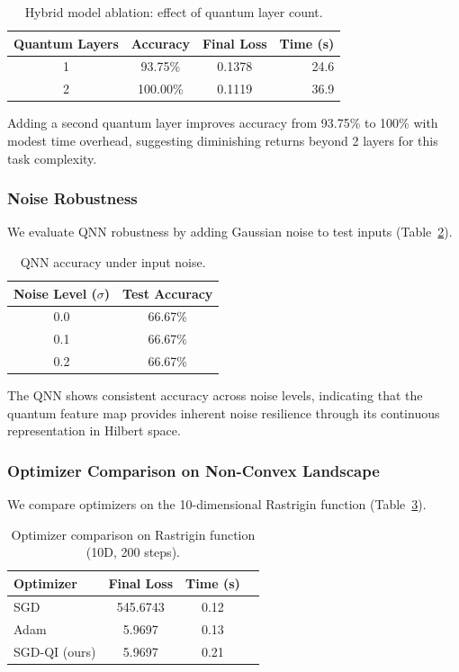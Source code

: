 \documentclass[11pt,a4paper]{article}
\begin{document}
\begin{table}[h]
\centering
\caption{Hybrid model ablation: effect of quantum layer count.}
\label{tab:ablation}
\begin{tabular}{cccr}
\toprule
Quantum Layers & Accuracy & Final Loss & Time (s) \\
\midrule
1 & 93.75\% & 0.1378 & 24.6 \\
2 & 100.00\% & 0.1119 & 36.9 \\
\bottomrule
\end{tabular}
\end{table}

Adding a second quantum layer improves accuracy from 93.75\% to 100\% with modest time overhead, suggesting diminishing returns beyond 2 layers for this task complexity.

\subsubsection{Noise Robustness}
We evaluate QNN robustness by adding Gaussian noise to test inputs (Table~\ref{tab:noise}).

\begin{table}[h]
\centering
\caption{QNN accuracy under input noise.}
\label{tab:noise}
\begin{tabular}{cc}
\toprule
Noise Level ($\sigma$) & Test Accuracy \\
\midrule
0.0 & 66.67\% \\
0.1 & 66.67\% \\
0.2 & 66.67\% \\
\bottomrule
\end{tabular}
\end{table}

The QNN shows consistent accuracy across noise levels, indicating that the quantum feature map provides inherent noise resilience through its continuous representation in Hilbert space.

\subsubsection{Optimizer Comparison on Non-Convex Landscape}
We compare optimizers on the 10-dimensional Rastrigin function (Table~\ref{tab:optimizer}).

\begin{table}[h]
\centering
\caption{Optimizer comparison on Rastrigin function (10D, 200 steps).}
\label{tab:optimizer}
\begin{tabular}{lccr}
\toprule
Optimizer & Final Loss & Time (s) \\
\midrule
SGD & 545.6743 & 0.12 \\
Adam & 5.9697 & 0.13 \\
SGD-QI (ours) & 5.9697 & 0.21 \\
\bottomrule
\end{tabular}
\end{table}
\end{document}
